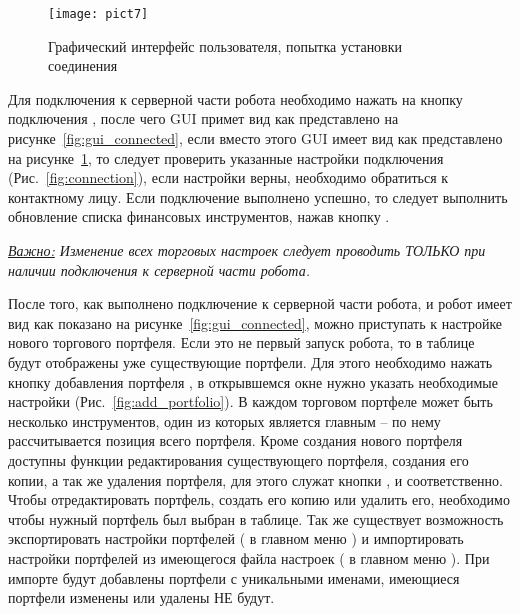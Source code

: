 \begin{figure}[h!]
\centering
\texttt{[image: pict7]}
\caption{Графический интерфейс пользователя, попытка установки соединения}
\label{fig:gui_not_connected}
\end{figure}
Для подключения к серверной части робота необходимо нажать на кнопку подключения , после чего GUI примет вид как представлено на
рисунке~\ref{fig:gui_connected}, если вместо этого GUI имеет вид как представлено на рисунке~\ref{fig:gui_not_connected}, то следует проверить указанные настройки подключения
(Рис.~\ref{fig:connection}), если настройки верны, необходимо обратиться к контактному лицу. Если подключение выполнено успешно, то следует выполнить обновление списка
финансовых инструментов, нажав кнопку .\newline

\noindent\textit{\underline{Важно:} Изменение всех торговых настроек следует проводить ТОЛЬКО при наличии подключения к серверной части робота.}


После того, как выполнено подключение к серверной части робота, и робот имеет вид как показано на рисунке~\ref{fig:gui_connected}, можно приступать к настройке нового
торгового портфеля. Если это не первый запуск робота, то в таблице будут отображены уже существующие портфели. Для этого необходимо нажать кнопку добавления портфеля
, в открывшемся окне нужно указать необходимые настройки (Рис.~\ref{fig:add_portfolio}). В каждом торговом портфеле может быть несколько
инструментов, один из которых является главным -- по нему рассчитывается позиция всего портфеля. Кроме создания нового портфеля доступны функции редактирования существующего
портфеля, создания его копии, а так же удаления портфеля, для этого служат кнопки ,  и
 соответственно. Чтобы отредактировать портфель, создать его копию или удалить его, необходимо чтобы нужный портфель был выбран в
таблице. Так же существует возможность экспортировать настройки портфелей ( в главном меню ) и импортировать настройки портфелей из имеющегося файла
настроек ( в главном меню ). При импорте будут добавлены портфели с уникальными именами, имеющиеся портфели изменены или удалены НЕ будут.

